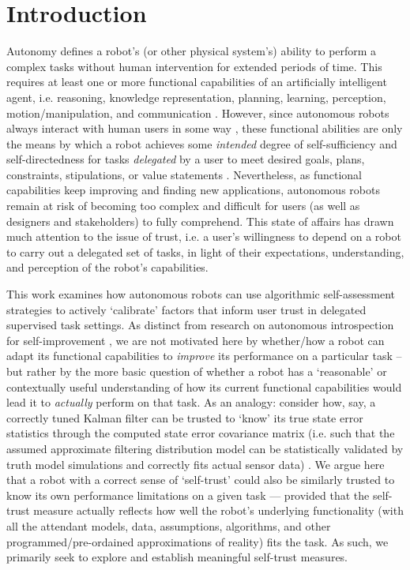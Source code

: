 \section{Introduction}


Autonomy defines a robot's (or other physical system's) ability to perform a complex tasks without human intervention for extended periods of time. This requires at least one or more functional capabilities of an artificially intelligent agent, i.e. reasoning, knowledge representation, planning, learning, perception, motion/manipulation, and communication \cite{Russell2010-wv}. 
However, since autonomous robots always interact with human users in some way \cite{Bradshaw2013-ck}, these functional abilities are only the means by which a robot achieves some \emph{intended} degree of self-sufficiency and self-directedness for tasks \emph{delegated} by a user to meet desired goals, plans, constraints, stipulations, or value statements \cite{Miller2014-av}. 
Nevertheless, as functional capabilities keep improving and finding new applications, autonomous robots remain at risk of becoming too complex and difficult for users (as well as designers and stakeholders) to fully comprehend.  
This state of affairs has drawn much attention to the issue of trust, i.e. a user's willingness to depend on a robot to carry out a delegated set of tasks, in light of their expectations, understanding, and perception of the robot's capabilities. 

This work examines how autonomous robots can use algorithmic self-assessment strategies to actively `calibrate' factors that inform user trust in delegated supervised task settings. 
As distinct from research on autonomous introspection for self-improvement \cite{NathanMichaelMichaelNathan, Posner}, 
we are not motivated here by whether/how a robot can adapt its functional capabilities to \emph{improve} its performance on a particular task -- but rather by the more basic question of whether a robot has a `reasonable' or contextually useful understanding of how its current functional capabilities would lead it to \emph{actually} perform on that task. As an analogy: consider how, say, a correctly tuned Kalman filter can be trusted to `know' its true state error statistics through the computed state error covariance matrix (i.e. such that the assumed approximate filtering distribution model can be statistically validated by truth model simulations and correctly fits actual sensor data) \cite{Bar-Shalom2001-tg}. We argue here that a robot with a correct sense of `self-trust' could also be similarly trusted to know its own performance limitations on a given task --- provided that the self-trust measure actually reflects how well the robot's underlying functionality (with all the attendant models, data, assumptions, algorithms, and other programmed/pre-ordained approximations of reality) fits the task. As such, we primarily seek to explore and establish meaningful self-trust measures. 

